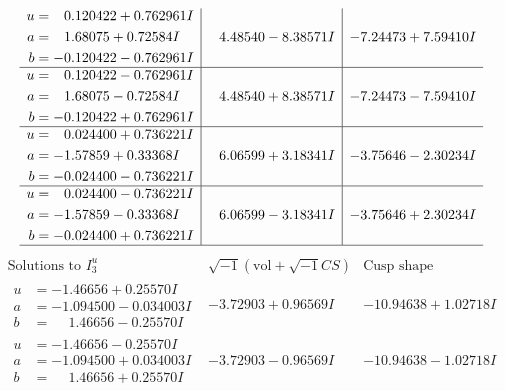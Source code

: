 \documentclass[1p]{elsarticle_modified}
\theoremstyle{definition}
\newcommand{\I}{\sqrt{-1}}
\begin{document}
$$\begin{array}{c|c|c}
\begin{aligned}
u &= \phantom{-}0.120422 + 0.762961 I \\
a &= \phantom{-}1.68075 + 0.72584 I \\
b &= -0.120422 - 0.762961 I\end{aligned}
 & \phantom{-}4.48540 - 8.38571 I & -7.24473 + 7.59410 I \\ \hline\begin{aligned}
u &= \phantom{-}0.120422 - 0.762961 I \\
a &= \phantom{-}1.68075 - 0.72584 I \\
b &= -0.120422 + 0.762961 I\end{aligned}
 & \phantom{-}4.48540 + 8.38571 I & -7.24473 - 7.59410 I \\ \hline\begin{aligned}
u &= \phantom{-}0.024400 + 0.736221 I \\
a &= -1.57859 + 0.33368 I \\
b &= -0.024400 - 0.736221 I\end{aligned}
 & \phantom{-}6.06599 + 3.18341 I & -3.75646 - 2.30234 I \\ \hline\begin{aligned}
u &= \phantom{-}0.024400 - 0.736221 I \\
a &= -1.57859 - 0.33368 I \\
b &= -0.024400 + 0.736221 I\end{aligned}
 & \phantom{-}6.06599 - 3.18341 I & -3.75646 + 2.30234 I\\
 \hline 
 \end{array}$$\newpage$$\begin{array}{c|c|c}  
\text{Solutions to }I^u_{3}& \I (\text{vol} + \sqrt{-1}CS) & \text{Cusp shape}\\
 \hline 
\begin{aligned}
u &= -1.46656 + 0.25570 I \\
a &= -1.094500 - 0.034003 I \\
b &= \phantom{-}1.46656 - 0.25570 I\end{aligned}
 & -3.72903 + 0.96569 I & -10.94638 + 1.02718 I \\ \hline\begin{aligned}
u &= -1.46656 - 0.25570 I \\
a &= -1.094500 + 0.034003 I \\
b &= \phantom{-}1.46656 + 0.25570 I\end{aligned}
 & -3.72903 - 0.96569 I & -10.94638 - 1.02718 I \\ \hline\begin{aligned}

\end{aligned}
\end{array}$$
\end{document}
